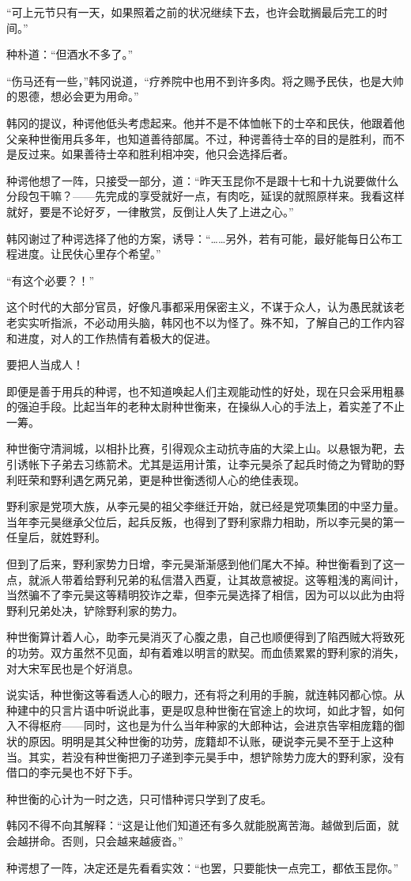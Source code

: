 “可上元节只有一天，如果照着之前的状况继续下去，也许会耽搁最后完工的时间。”

种朴道：“但酒水不多了。”

“伤马还有一些，”韩冈说道，“疗养院中也用不到许多肉。将之赐予民伕，也是大帅的恩德，想必会更为用命。”

韩冈的提议，种谔他低头考虑起来。他并不是不体恤帐下的士卒和民伕，他跟着他父亲种世衡用兵多年，也知道善待部属。不过，种谔善待士卒的目的是胜利，而不是反过来。如果善待士卒和胜利相冲突，他只会选择后者。

种谔他想了一阵，只接受一部分，道：“昨天玉昆你不是跟十七和十九说要做什么分段包干嘛？——先完成的享受就好一点，有肉吃，延误的就照原样来。我看这样就好，要是不论好歹，一律散赏，反倒让人失了上进之心。”

韩冈谢过了种谔选择了他的方案，诱导：“……另外，若有可能，最好能每日公布工程进度。让民伕心里存个希望。”

“有这个必要？！”

这个时代的大部分官员，好像凡事都采用保密主义，不谋于众人，认为愚民就该老老实实听指派，不必动用头脑，韩冈也不以为怪了。殊不知，了解自己的工作内容和进度，对人的工作热情有着极大的促进。

要把人当成人！

即便是善于用兵的种谔，也不知道唤起人们主观能动性的好处，现在只会采用粗暴的强迫手段。比起当年的老种太尉种世衡来，在操纵人心的手法上，着实差了不止一筹。

种世衡守清涧城，以相扑比赛，引得观众主动抗寺庙的大梁上山。以悬银为靶，去引诱帐下子弟去习练箭术。尤其是运用计策，让李元昊杀了起兵时倚之为臂助的野利旺荣和野利遇乞两兄弟，更是种世衡透彻人心的绝佳表现。

野利家是党项大族，从李元昊的祖父李继迁开始，就已经是党项集团的中坚力量。当年李元昊继承父位后，起兵反叛，也得到了野利家鼎力相助，所以李元昊的第一任皇后，就姓野利。

但到了后来，野利家势力日增，李元昊渐渐感到他们尾大不掉。种世衡看到了这一点，就派人带着给野利兄弟的私信潜入西夏，让其故意被捉。这等粗浅的离间计，当然骗不了李元昊这等精明狡诈之辈，但李元昊选择了相信，因为可以以此为由将野利兄弟处决，铲除野利家的势力。

种世衡算计着人心，助李元昊消灭了心腹之患，自己也顺便得到了陷西贼大将致死的功劳。双方虽然不见面，却有着难以明言的默契。而血债累累的野利家的消失，对大宋军民也是个好消息。

说实话，种世衡这等看透人心的眼力，还有将之利用的手腕，就连韩冈都心惊。从种建中的只言片语中听说此事，更是叹息种世衡在官途上的坎坷，如此才智，如何入不得枢府——同时，这也是为什么当年种家的大郎种诂，会进京告宰相庞籍的御状的原因。明明是其父种世衡的功劳，庞籍却不认账，硬说李元昊不至于上这种当。其实，若没有种世衡把刀子递到李元昊手中，想铲除势力庞大的野利家，没有借口的李元昊也不好下手。

种世衡的心计为一时之选，只可惜种谔只学到了皮毛。

韩冈不得不向其解释：“这是让他们知道还有多久就能脱离苦海。越做到后面，就会越拼命。否则，只会越来越疲沓。”

种谔想了一阵，决定还是先看看实效：“也罢，只要能快一点完工，都依玉昆你。”

